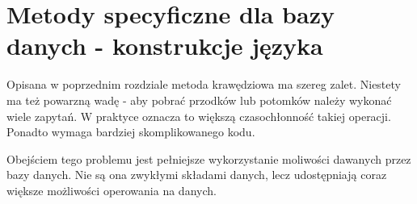 \chapter{Metody specyficzne dla bazy danych - konstrukcje języka}

% 
% 
% 

Opisana w poprzednim rozdziale metoda krawędziowa ma szereg zalet. 
Niestety ma też powarzną wadę - aby pobrać przodków lub potomków należy wykonać wiele zapytań.
W praktyce oznacza to większą czasochłonność takiej operacji. 
Ponadto wymaga bardziej skomplikowanego kodu.

Obejściem tego problemu jest pełniejsze wykorzystanie moliwości dawanych przez bazy danych.
Nie są ona zwykłymi składami danych, lecz udostępniają coraz większe możliwości operowania na danych.

